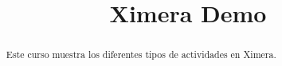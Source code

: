 \documentclass{xourse}
\title{Ximera Demo}
\begin{document}
  
\begin{abstract} %
Este curso muestra los diferentes tipos de actividades en Ximera.
\end{abstract}  
\maketitle  
 
 
\end{document}
